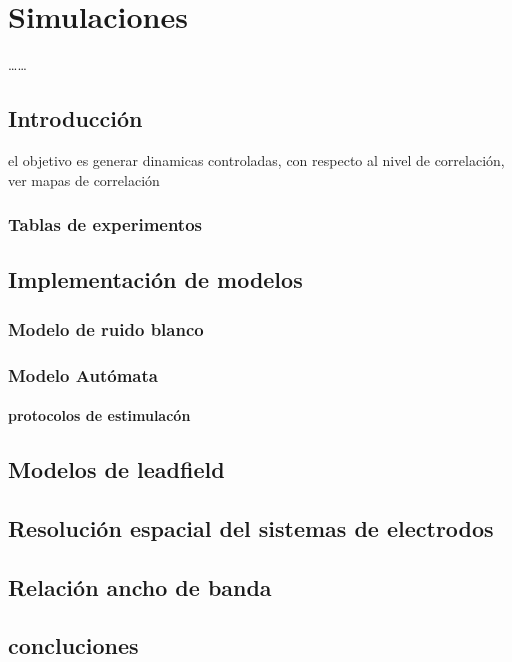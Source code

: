 \chapter{Simulaciones}
\begin{resumen}
\ldots\ldots
\end{resumen}

\section{Introducción}
el objetivo es generar dinamicas controladas, con respecto al nivel de
correlación, ver mapas de correlación

\subsection{Tablas de experimentos}

\section{Implementación de modelos}
\subsection{Modelo de ruido blanco}
\subsection{Modelo Autómata}
\subsubsection{protocolos de estimulacón}

\section{Modelos de leadfield}

\section{Resolución espacial del sistemas de electrodos}
\section{Relación ancho de banda}


\section{concluciones}

